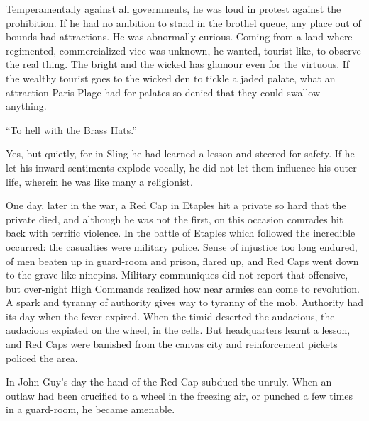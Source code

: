 Temperamentally against all governments, he was loud in protest against the 
prohibition. If he had no ambition to stand in the brothel queue, any place 
out of bounds had attractions. He was abnormally curious. Coming from a land 
where regimented, commercialized vice was unknown, he wanted, tourist-like, 
to observe the real thing. The bright and the wicked has glamour even for 
the virtuous. If the wealthy tourist goes to the wicked den to tickle a jaded 
palate, what an attraction Paris Plage had for palates so denied that they 
could swallow anything.

``To hell with the Brass Hats.''

Yes, but quietly, for in Sling he had learned a lesson and steered for safety. 
If he let his inward sentiments explode vocally, he did not let them influence 
his outer life, wherein he was like many a religionist.

One day, later in the war, a Red Cap in Etaples hit a private so hard that the 
private died, and although he was not the first, on this occasion comrades hit 
back with terrific violence. In the battle of Etaples which followed the 
incredible occurred: the casualties were military police. Sense of injustice 
too long endured, of men beaten up in guard-room and prison, flared up, and 
Red Caps went down to the grave like ninepins. Military communiques did not 
report that offensive, but over-night High Commands realized how near armies 
can come to revolution. A spark and tyranny of authority gives way to tyranny 
of the mob. Authority had its day when the fever expired. When the timid deserted 
the audacious, the audacious expiated on the wheel, in the cells. But headquarters 
learnt a lesson, and Red Caps were banished from the canvas city and reinforcement 
pickets policed the area.

In John Guy's day the hand of the Red Cap subdued the unruly. When an outlaw had 
been crucified to a wheel in the freezing air, or punched a few times in a 
guard-room, he became amenable.